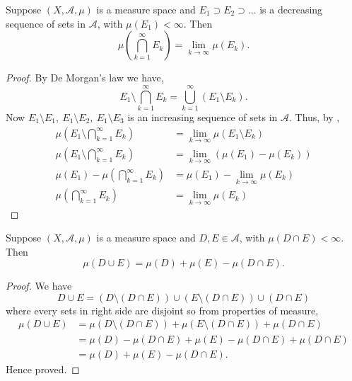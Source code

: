\begin{theorem}[]
    Suppose $(X,\mathcal{A},\mu)$ is a measure space and $E_1\supset E_2\supset\ldots$ is a decreasing sequence of sets in $\mathcal{A}$, with $\mu(E_1)<\infty$. Then
    \[
        \mu\left( \bigcap_{k=1}^{\infty}E_k \right) = \lim_{k\to\infty}\mu(E_k).
    \]
\end{theorem}
\begin{proof}
    By De Morgan's law we have,
    \[
        E_1\setminus \bigcap_{k=1}^{\infty}E_k = \bigcup_{k=1}^{\infty}(E_1\setminus E_k).
    \]
    Now $E_1\setminus E_1,\ E_1\setminus E_2,\ E_1\setminus E_3$ is an increasing sequence of sets in $\mathcal{A}$.
    Thus, by ,
    \begin{align*}
        \mu\left(E_1\setminus \bigcap_{k=1}^{\infty}E_k\right) &= \lim_{k\to\infty}\mu(E_1\setminus E_k)\\
        \mu\left(E_1\setminus \bigcap_{k=1}^{\infty}E_k\right) &= \lim_{k\to\infty}\left( \mu(E_1)-\mu(E_k) \right) \\
        \mu(E_1)-\mu\left( \bigcap_{k=1}^{\infty}E_k \right) &= \mu(E_1)-\lim_{k\to\infty}\mu(E_k)\\
        \mu\left( \bigcap_{k=1}^{\infty}E_k \right) &= \lim_{k\to\infty}\mu(E_k)
    \end{align*}
\end{proof}
\begin{theorem}
    Suppose $(X,\mathcal{A},\mu)$ is a measure space and $D,E\in\mathcal{A}$, with $\mu(D\cap E)<\infty$. Then
    \[
         \mu(D\cup E)=\mu(D)+\mu(E)-\mu(D\cap E).
    \]
\end{theorem}
\begin{proof}
    We have 
    \[
        D\cup E=(D\setminus (D\cap E))\cup(E\setminus (D\cap E))\cup(D\cap E)
    \]
    where every sets in right side are disjoint so from properties of measure,
    \begin{align*}
        \mu(D\cup E)&=\mu(D\setminus (D\cap E)) + \mu(E\setminus (D\cap E)) + \mu(D\cap E)\\
                    &=\mu(D) - \mu(D\cap E) + \mu(E) - \mu(D\cap E) + \mu(D\cap E)\\
                    &=\mu(D)+\mu(E)-\mu(D\cap E).
    \end{align*}
    Hence proved.
\end{proof}
